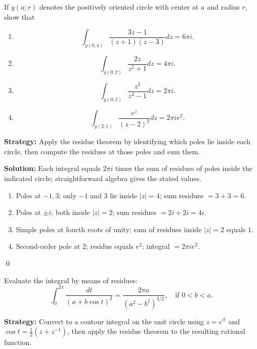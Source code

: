 \begin{problembox}
\begin{problemstatement}
If \( y(a; r) \) denotes the positively oriented circle with center at \( a \) and radius \( r \), show that
\begin{enumerate}[label=(\alph*)]
\item \[ \int_{y(0;4)} \frac{3z - 1}{(z + 1)(z - 3)} dz = 6\pi i. \]
\item \[ \int_{y(0;2)} \frac{2z}{z^2 + 1} dz = 4\pi i. \]
\item \[ \int_{y(0;2)} \frac{z^3}{z^4 - 1} dz = 2\pi i. \]
\item \[ \int_{y(2;1)} \frac{e^z}{(z - 2)^2} dz = 2\pi ie^2. \]
\end{enumerate}
\end{problemstatement}
\end{problembox}

\noindent\textbf{Strategy:} Apply the residue theorem by identifying which poles lie inside each circle, then compute the residues at those poles and sum them.

\bigskip\noindent\textbf{Solution:}
Each integral equals $2\pi i$ times the sum of residues of poles inside the indicated circle; straightforward algebra gives the stated values.
\begin{enumerate}[label=(\alph*)]
\item Poles at $-1,3$; only $-1$ and $3$ lie inside $|z|=4$; sum residues $=3+3=6$.
\item Poles at $\pm i$; both inside $|z|=2$; sum residues $=2i+2i=4i$.
\item Simple poles at fourth roots of unity; sum of residues inside $|z|=2$ equals $1$.
\item Second-order pole at $2$; residue equals $e^2$; integral $=2\pi i e^2$.
\end{enumerate}\qed


\begin{problembox}
\begin{problemstatement}
Evaluate the integral by means of residues:
\[ \int_0^{2\pi} \frac{dt}{(a + b \cos t)^2} = \frac{2\pi a}{(a^2 - b^2)^{3/2}}, \quad \text{if } 0 < b < a. \]
\end{problemstatement}
\end{problembox}

\noindent\textbf{Strategy:} Convert to a contour integral on the unit circle using \( z = e^{it} \) and \( \cos t = \frac{1}{2}(z + z^{-1}) \), then apply the residue theorem to the resulting rational function.

